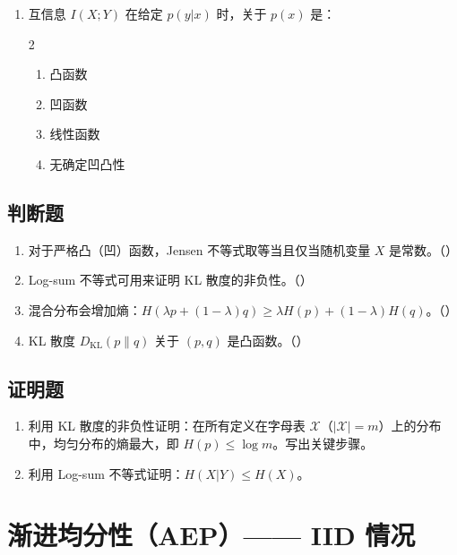 \documentclass[12pt,a4paper]{ctexart}
\newcommand{\XX}{\mathcal{X}}
\newcommand{\DKL}{D_{\mathrm{KL}}}
\begin{document}
\begin{enumerate}[label=\arabic*., leftmargin=*]
\item 互信息 $I(X;Y)$ 在给定 $p(y|x)$ 时，关于 $p(x)$ 是：
\begin{multicols}{2}
\begin{enumerate}[label=(\Alph*)]
  \item 凸函数
  \item 凹函数
  \item 线性函数
  \item 无确定凹凸性
\end{enumerate}
\end{multicols}

\end{enumerate}

\subsection*{判断题}

\begin{enumerate}[label=\arabic*., leftmargin=*]
\item 对于严格凸（凹）函数，Jensen 不等式取等当且仅当随机变量 $X$ 是常数。（\quad）
\item Log-sum 不等式可用来证明 KL 散度的非负性。（\quad）
\item 混合分布会增加熵：$H(\lambda p + (1-\lambda)q) \geq \lambda H(p) + (1-\lambda)H(q)$。（\quad）
\item KL 散度 $\DKL(p\|q)$ 关于 $(p,q)$ 是凸函数。（\quad）
\end{enumerate}

\subsection*{证明题}

\begin{enumerate}[label=\textbf{\arabic*.}, leftmargin=*]
\item 利用 KL 散度的非负性证明：在所有定义在字母表 $\XX$（$|\XX|=m$）上的分布中，均匀分布的熵最大，即 $H(p) \leq \log m$。写出关键步骤。
\item 利用 Log-sum 不等式证明：$H(X|Y) \leq H(X)$。
\end{enumerate}

\newpage

\section{渐进均分性（AEP）—— IID 情况}
\end{document}
